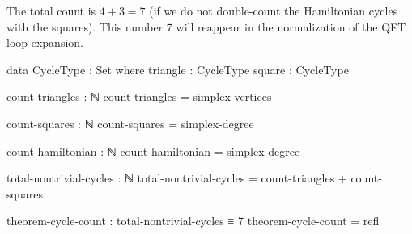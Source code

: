 \documentclass[11pt,a4paper]{book}
\begin{document}
The total count is $4 + 3 = 7$ (if we do not double-count the Hamiltonian cycles with the 
squares). This number 7 will reappear in the normalization of the QFT loop expansion.

\begin{code}
data CycleType : Set where
  triangle : CycleType
  square   : CycleType

count-triangles : ℕ
count-triangles = simplex-vertices

count-squares : ℕ
count-squares = simplex-degree

count-hamiltonian : ℕ
count-hamiltonian = simplex-degree

total-nontrivial-cycles : ℕ
total-nontrivial-cycles = count-triangles + count-squares

theorem-cycle-count : total-nontrivial-cycles ≡ 7
theorem-cycle-count = refl
\end{code}
\end{document}
